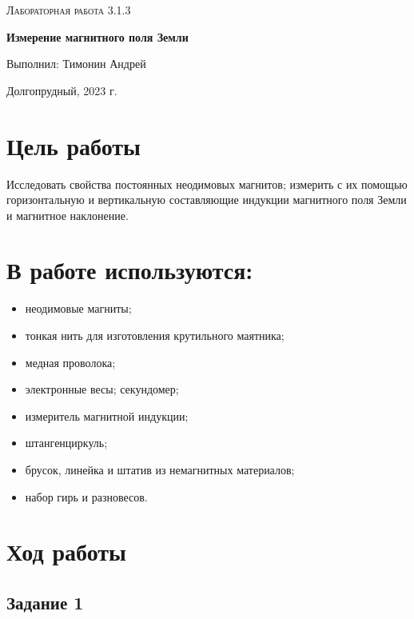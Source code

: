 \documentclass[a4paper]{article}
\begin{document}
\begin{titlepage}
	\centering
	\vspace{5cm}
	\vspace{4cm}
	{\scshape\Large Лабораторная работа 3.1.3\par}
	\vspace{1cm}
	{\huge\bfseries Измерение магнитного поля Земли\par}
	\vspace{1cm}
	\vfill
\begin{flushright}
	\vspace{0.3cm}
	{\LARGE Выполнил: Тимонин Андрей}
\end{flushright}
	

	\vfill

	Долгопрудный, 2023 г.
\end{titlepage}

\section{Цель работы}

Исследовать свойства постоянных неодимовых магнитов; измерить с их помощью горизонтальную и вертикальную составляющие индукции магнитного поля Земли и магнитное наклонение.

\section{В работе используются:}
\begin{itemize}
    \item неодимовые магниты; 
    \item тонкая нить для изготовления крутильного маятника; 
    \item медная проволока; 
    \item электронные весы; секундомер; 
    \item измеритель магнитной индукции; 
    \item штангенциркуль; 
    \item брусок, линейка и штатив из немагнитных материалов; 
    \item набор гирь и разновесов.
\end{itemize}

\section{Ход работы}

\subsection{Задание 1}
\end{document}
